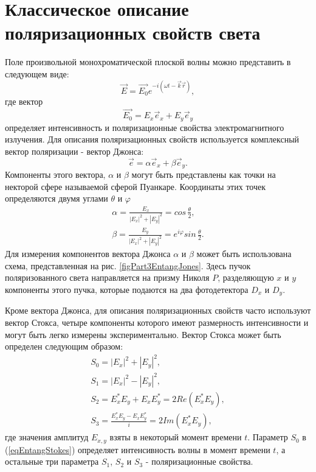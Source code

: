 \section{Классическое описание поляризационных свойств света}
Поле произвольной монохроматической плоской волны можно представить в
следующем виде:
\begin{equation}
\vec{E} = \vec{E_0} e^{-i \left(\omega t - \vec{k}\vec{r}\right)},
\nonumber
\end{equation}
где вектор 
\[
\vec{E_0} = E_{x}\vec{e}_x + E_{y}\vec{e}_y
\]
определяет интенсивность и поляризационные свойства электромагнитного
излучения. Для описания поляризационных свойств используется
комплексный вектор поляризации - вектор Джонса:
\begin{equation}
\vec{e} = \alpha \vec{e}_x + \beta \vec{e}_y.
\label{eqEntangJones}
\end{equation}
Компоненты этого вектора, $\alpha$ и $\beta$ могут быть представлены
как точки на некторой сфере называемой сферой Пуанкаре. Координаты
этих точек определяются двумя углами $\theta$ и $\varphi$
\begin{eqnarray}
\alpha = \frac{E_x}{\left|E_x\right|^2 + \left|E_y\right|^2} = 
 cos \, \frac{\theta}{2},
\nonumber \\
\beta = \frac{E_y}{\left|E_x\right|^2 + \left|E_y\right|^2} = 
 e^{i\varphi} sin \, \frac{\theta}{2}.
\nonumber
\end{eqnarray}
Для измерения компонентов вектора Джонса $\alpha$ и $\beta$ может быть
использована схема, представленная на
рис. \ref{figPart3EntangJones}. Здесь пучок поляризованного света
направляется на призму Николя $P$, разделяющую $x$ и $y$ компоненты
этого пучка, которые подаются на два фотодетектора $D_x$ и $D_y$.



Кроме вектора Джонса, для описания поляризационных свойств часто
используют вектор Стокса, четыре компоненты которого
имеют размерность интенсивности и могут быть легко измерены
экспериментально. Вектор Стокса может быть определен следующим образом:
\begin{eqnarray}
S_0 = \left|E_x\right|^2 + \left|E_y\right|^2,
\nonumber \\
S_1 = \left|E_x\right|^2 - \left|E_y\right|^2,
\nonumber \\
S_2 = E_x^{*} E_y + E_x E_y^{*} = 2 Re \left(E_x^{*} E_y\right),
\nonumber \\
S_3 = \frac{E_x^{*} E_y - E_x E_y^{*}}{i} = 2 Im \left(E_x^{*}
E_y\right),
\label{eqEntangStokes}
\end{eqnarray}
где значения амплитуд $E_{x,y}$ взяты в некоторый момент времени $t$. 
Параметр $S_0$ в (\ref{eqEntangStokes}) определяет интенсивность волны
в момент времени $t$,
а остальные три параметра $S_1$, $S_2$ и $S_3$ - поляризационные
свойства. 

